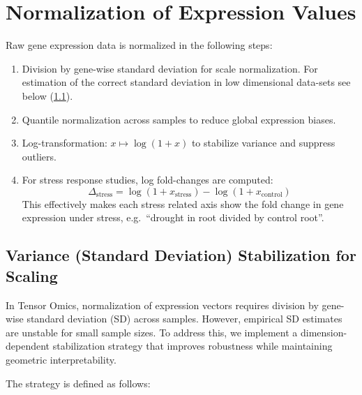 \section{Normalization of Expression Values}
    Raw gene expression data is normalized in the following steps:
    \begin{enumerate}
      \item Division by gene-wise standard deviation for scale normalization. For estimation of the correct standard deviation in low dimensional data-sets see below (\ref{loess_sd_estimation}).
        \item Quantile normalization across samples to reduce global expression biases.
        \item Log-transformation: \( x \mapsto \log(1 + x) \) to stabilize variance and suppress outliers.
        \item For stress response studies, log fold-changes are computed: 
        \[
            \Delta_{\text{stress}} = \log(1 + x_{\text{stress}}) - \log(1 + x_{\text{control}})
        \]
        This effectively makes each stress related axis show the fold change in
        gene expression under stress, e.g.\ ``drought in root divided by control
        root''.
    \end{enumerate}

    \subsection{Variance (Standard Deviation) Stabilization for Scaling}\label{loess_sd_estimation}

        In Tensor Omics, normalization of expression vectors requires division by gene-wise standard deviation (SD) across samples.
        However, empirical SD estimates are unstable for small sample sizes.
        To address this, we implement a dimension-dependent stabilization strategy that improves robustness while maintaining geometric interpretability.

        The strategy is defined as follows:

